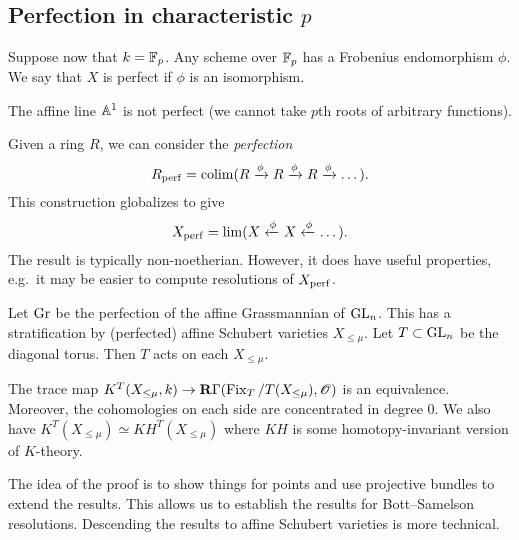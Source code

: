 \documentclass{article}
\begin{document}
\subsection{Perfection in characteristic $p$}

Suppose now that $k = \FF_p$.
Any scheme over $\FF_p$ has a Frobenius endomorphism $\phi$.
We say that $X$ is perfect if $\phi$ is an isomorphism.

\begin{ex}
  The affine line $\AA^1$ is not perfect (we cannot take $p$th roots of arbitrary functions).
\end{ex}

Given a ring $R$, we can consider the \emph{perfection}
\[
  R_\perf = \colim(R \xrightarrow{\phi} R \xrightarrow{\phi} R \xrightarrow{\phi} \dots).
\]
This construction globalizes to give
\[
  X_\perf = \lim(X \xleftarrow{\phi} X \xleftarrow{\phi} \dots).
\]
The result is typically non-noetherian.
However, it does have useful properties, e.g.\ it may be easier to compute resolutions of $X_\perf$.

Let $\Gr$ be the perfection of the affine Grassmannian of $\GL_n$.
This has a stratification by (perfected) affine Schubert varieties $X_{\leq \mu}$.
Let $T \subset \GL_n$ be the diagonal torus.
Then $T$ acts on each $X_{\leq \mu}$.

\begin{thm}[L]
  The trace map $K^T(X_{\leq \mu}, k) \to \Rbf \Gamma(\Fix_T/T(X_{\leq \mu}), \Osc)$ is an equivalence.
  Moreover, the cohomologies on each side are concentrated in degree $0$.
  We also have $K^T(X_{\leq \mu}) \simeq KH^T(X_{\leq \mu})$ where $KH$ is some homotopy-invariant version of $K$-theory.
\end{thm}

The idea of the proof is to show things for points and use projective bundles to extend the results.
This allows us to establish the results for Bott--Samelson resolutions.
Descending the results to affine Schubert varieties is more technical.
\end{document}
